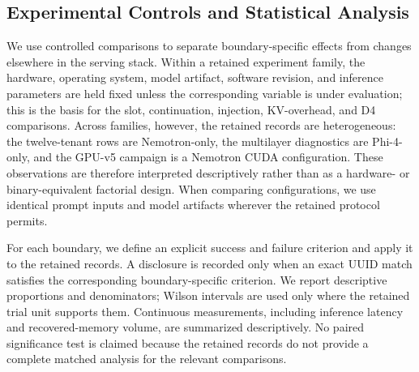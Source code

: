 \documentclass[journal,tifs]{IEEEtran}
\begin{document}
\subsection{Experimental Controls and Statistical Analysis}

We use controlled comparisons to separate boundary-specific effects from
changes elsewhere in the serving stack. Within a retained experiment family,
the hardware, operating system, model artifact, software revision, and
inference parameters are held fixed unless the corresponding variable is
under evaluation; this is the basis for the slot, continuation, injection,
KV-overhead, and D4 comparisons. Across families, however, the retained
records are heterogeneous: the twelve-tenant rows are Nemotron-only, the
multilayer diagnostics are Phi-4-only, and the GPU-v5 campaign is a
Nemotron CUDA configuration. These observations are therefore interpreted
descriptively rather than as a hardware- or binary-equivalent factorial
design. When comparing configurations, we use identical prompt inputs and
model artifacts wherever the retained protocol permits.

For each boundary, we define an explicit success and failure criterion
and apply it to the retained records. A disclosure is recorded only when
an exact UUID match satisfies the corresponding boundary-specific
criterion. We report descriptive proportions and denominators; Wilson
intervals are used only where the retained trial unit supports them.
Continuous measurements, including inference latency and recovered-memory
volume, are summarized descriptively. No paired significance test is
claimed because the retained records do not provide a complete matched
analysis for the relevant comparisons.



\end{document}
